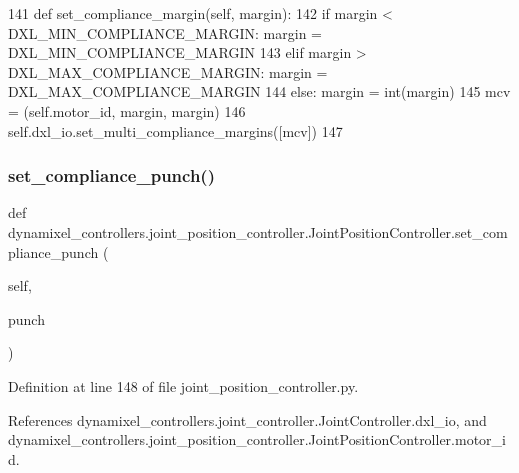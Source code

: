 \begin{DoxyCode}
141     \textcolor{keyword}{def }set\_compliance\_margin(self, margin):
142         \textcolor{keywordflow}{if} margin < DXL\_MIN\_COMPLIANCE\_MARGIN: margin = DXL\_MIN\_COMPLIANCE\_MARGIN
143         \textcolor{keywordflow}{elif} margin > DXL\_MAX\_COMPLIANCE\_MARGIN: margin = DXL\_MAX\_COMPLIANCE\_MARGIN
144         \textcolor{keywordflow}{else}: margin = int(margin)
145         mcv = (self.motor\_id, margin, margin)
146         self.dxl\_io.set\_multi\_compliance\_margins([mcv])
147 
\end{DoxyCode}
\mbox{\label{classdynamixel__controllers_1_1joint__position__controller_1_1_joint_position_controller_ab4a3ec4871c686e83a0bbd4d0cb0cd14}} 
\subsubsection{\texorpdfstring{set\+\_\+compliance\+\_\+punch()}{set\_compliance\_punch()}}
{\footnotesize\ttfamily def dynamixel\+\_\+controllers.\+joint\+\_\+position\+\_\+controller.\+Joint\+Position\+Controller.\+set\+\_\+compliance\+\_\+punch (\begin{DoxyParamCaption}\item[{}]{self,  }\item[{}]{punch }\end{DoxyParamCaption})}



Definition at line 148 of file joint\+\_\+position\+\_\+controller.\+py.



References dynamixel\+\_\+controllers.\+joint\+\_\+controller.\+Joint\+Controller.\+dxl\+\_\+io, and dynamixel\+\_\+controllers.\+joint\+\_\+position\+\_\+controller.\+Joint\+Position\+Controller.\+motor\+\_\+id.



